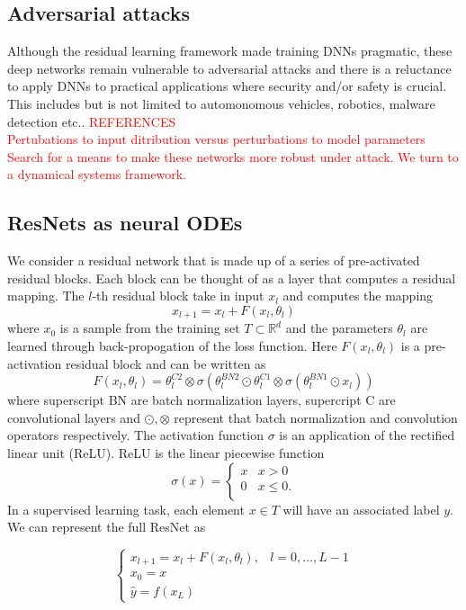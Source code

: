 \documentclass[12pt]{article}
\begin{document}
\subsection{Adversarial attacks}
Although the residual learning framework made training DNNs pragmatic, these deep networks remain vulnerable to adversarial attacks and there is a reluctance to apply DNNs to practical applications where security and/or safety is crucial. This includes but is not limited to automonomous vehicles, robotics, malware detection etc.. \textcolor{red}{REFERENCES} \\
\textcolor{red}{Pertubations to input ditribution versus perturbations to model parameters} \\
\textcolor{red}{Search for a means to make these networks more robust under attack. We turn to a dynamical systems framework.}
\subsection{ResNets as neural ODEs}
We consider a residual network that is made up of a series of pre-activated residual blocks. Each block can be thought of as a layer that computes a residual mapping. The $l$-th residual block take in input $x_l$ and computes the mapping
$$ x_{l+1} = x_{l} + F(x_l,\theta_l)$$
where $x_0$ is a sample from the training set $T \subset \mathbb{R}^d $ and the parameters $\theta_l$ are learned through back-propogation of the loss function. Here $F(x_l,\theta_l)$ is a pre-activation residual block and can be written as
$$ F(x_l,\theta_l) =  \theta_l^{C2}\otimes\sigma(\theta_l^{BN2}\odot\theta_l^{C1}\otimes\sigma(\theta_l^{BN1}\odot x_l))$$
where superscript BN are batch normalization layers, supercript C are convolutional layers and $\odot, \otimes$ represent that batch normalization and convolution operators respectively. The activation function $\sigma$ is an application of the rectified linear unit (ReLU). ReLU is the linear piecewise function
\begin{equation*}
\sigma(x) = \begin{cases} x & x > 0 \\
 0 & x \leq 0. \\
\end{cases}
\end{equation*}
In a supervised learning task, each element $x \in T$ will have an associated label $y$. We can represent the full ResNet as

\begin{equation} \begin{cases}
x_{l+1} = x_l + F(x_l,\theta_l), & l=0,\dots,L-1 \\
x_0 = x \\
\hat y = f(x_L)
\end{cases}
\label{eq:sys}
\end{equation}
\end{document}
